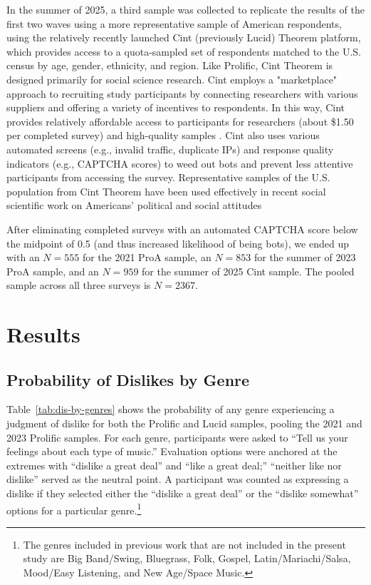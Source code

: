 \documentclass[12pt]{article}
\begin{document}
In the summer of 2025, a third sample was collected to replicate the results of the first two waves using a more representative sample of American respondents, using the relatively recently launched Cint (previously Lucid) Theorem platform, which provides access to a quota-sampled set of respondents matched to the U.S. census by age, gender, ethnicity, and region. Like Prolific, Cint Theorem is designed primarily for social science research. Cint employs a "marketplace" approach to recruiting study participants by connecting researchers with various suppliers and offering a variety of incentives to respondents. In this way, Cint provides relatively affordable access to participants for researchers (about \$1.50 per completed survey) and high-quality samples \citep{crabtree2025yes-e5f}. Cint also uses various automated screens (e.g., invalid traffic, duplicate IPs) and response quality indicators (e.g., CAPTCHA scores) to weed out bots and prevent less attentive participants from accessing the survey. Representative samples of the U.S. population from Cint Theorem have been used effectively in recent social scientific work on Americans' political and social attitudes \citep[e.g.,][]{keskintrk2025what-483} 

After eliminating completed surveys with an automated CAPTCHA score below the midpoint of 0.5 (and thus increased likelihood of being bots), we ended up with an $N = 555$ for the 2021 ProA sample, an $N = 853$ for the summer of 2023 ProA sample, and an $N = 959$ for the summer of 2025 Cint sample. The pooled sample across all three surveys is $N = 2367$.  

\section*{Results}
\subsection*{Probability of Dislikes by Genre}
Table~\ref{tab:dis-by-genres} shows the probability of any genre experiencing a judgment of dislike for both the Prolific and Lucid samples, pooling the 2021 and 2023 Prolific samples. For each genre, participants were asked to ``Tell us your feelings about each type of music.'' Evaluation options were anchored at the extremes with ``dislike a great deal'' and ``like a great deal;'' ``neither like nor dislike'' served as the neutral point. A participant was counted as expressing a dislike if they selected either the ``dislike a great deal'' or the ``dislike somewhat'' options for a particular genre.\footnote{The genres included in previous work that are not included in the present study are Big Band/Swing, Bluegrass, Folk, Gospel, Latin/Mariachi/Salsa, Mood/Easy Listening, and New Age/Space Music.} 
\end{document}
